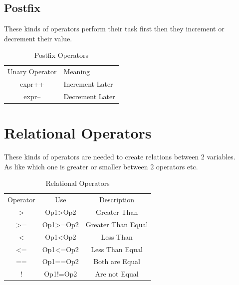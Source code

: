 \documentclass[openany]{book}  %
\begin{document}
\subsection{Postfix}
These kinds of operators\cite{Ref8} perform their task first then they increment or \\
decrement their value.
% 
%
\begin{table}[htbp]
    \begin{tabular}{cl}
        Unary Operator & Meaning          \\
        expr++         & Increment  Later \\
        expr--         & Decrement Later
    \end{tabular}
    \centering
    \caption{Postfix Operators}
\end{table}
% 
% 
\section{Relational Operators}
These kinds of operators\cite{Ref8} are needed to create relations between 2 variables. \\
As like which one is greater or smaller between 2 operators etc.
% 
%
\begin{table}[htbp]
    \begin{tabular}{ccc}
        Operator        & Use                   & Description        \\
        \textgreater{}  & Op1\textgreater{}Op2  & Greater Than       \\
        \textgreater{}= & Op1\textgreater{}=Op2 & Greater Than Equal \\
        \textless{}     & Op1\textless{}Op2     & Less Than          \\
        \textless{}=    & Op1\textless{}=Op2    & Less Than Equal    \\
        ==              & Op1==Op2              & Both are Equal     \\
        !               & Op1!=Op2              & Are not Equal
    \end{tabular}
    \centering
    \caption{Relational Operators}
\end{table}

\newpage

% 
% 
\end{document}
